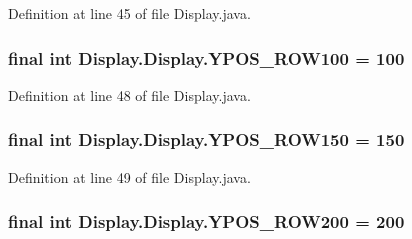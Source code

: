 Definition at line 45 of file Display.\+java.

\hypertarget{class_display_1_1_display_ab910e7da741fb624b211994905f5a1ec}{}
\subsubsection[{Y\+P\+O\+S\+\_\+\+R\+O\+W100}]{\setlength{\rightskip}{0pt plus 5cm}final int Display.\+Display.\+Y\+P\+O\+S\+\_\+\+R\+O\+W100 = 100\hspace{0.3cm}{\ttfamily [static]}}\label{class_display_1_1_display_ab910e7da741fb624b211994905f5a1ec}


Definition at line 48 of file Display.\+java.

\hypertarget{class_display_1_1_display_a38a83d9cebcb54826379194267a2ab4a}{}
\subsubsection[{Y\+P\+O\+S\+\_\+\+R\+O\+W150}]{\setlength{\rightskip}{0pt plus 5cm}final int Display.\+Display.\+Y\+P\+O\+S\+\_\+\+R\+O\+W150 = 150\hspace{0.3cm}{\ttfamily [static]}}\label{class_display_1_1_display_a38a83d9cebcb54826379194267a2ab4a}


Definition at line 49 of file Display.\+java.

\hypertarget{class_display_1_1_display_af186989bbcc82bddc811ce9727cb1d4d}{}
\subsubsection[{Y\+P\+O\+S\+\_\+\+R\+O\+W200}]{\setlength{\rightskip}{0pt plus 5cm}final int Display.\+Display.\+Y\+P\+O\+S\+\_\+\+R\+O\+W200 = 200\hspace{0.3cm}{\ttfamily [static]}}\label{class_display_1_1_display_af186989bbcc82bddc811ce9727cb1d4d}


